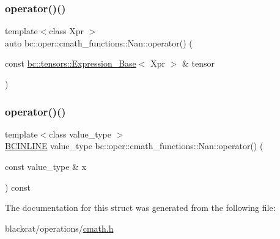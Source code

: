 \mbox{\label{structbc_1_1oper_1_1cmath__functions_1_1Nan_a662d1e5841e0d6d1da990d5fb4ab940d}} 
\subsubsection{\texorpdfstring{operator()()}{operator()()}\hspace{0.1cm}{\footnotesize\ttfamily [2/3]}}
{\footnotesize\ttfamily template$<$class Xpr $>$ \\
auto bc\+::oper\+::cmath\+\_\+functions\+::\+Nan\+::operator() (\begin{DoxyParamCaption}\item[{const \hyperlink{classbc_1_1tensors_1_1Expression__Base}{bc\+::tensors\+::\+Expression\+\_\+\+Base}$<$ Xpr $>$ \&}]{tensor }\end{DoxyParamCaption})\hspace{0.3cm}{\ttfamily [inline]}}

\mbox{\label{structbc_1_1oper_1_1cmath__functions_1_1Nan_a7679125e1815040c8d037d1c2ae3adad}} 
\subsubsection{\texorpdfstring{operator()()}{operator()()}\hspace{0.1cm}{\footnotesize\ttfamily [3/3]}}
{\footnotesize\ttfamily template$<$class value\+\_\+type $>$ \\
\hyperlink{common_8h_a6699e8b0449da5c0fafb878e59c1d4b1}{B\+C\+I\+N\+L\+I\+NE} value\+\_\+type bc\+::oper\+::cmath\+\_\+functions\+::\+Nan\+::operator() (\begin{DoxyParamCaption}\item[{const value\+\_\+type \&}]{x }\end{DoxyParamCaption}) const\hspace{0.3cm}{\ttfamily [inline]}}



The documentation for this struct was generated from the following file\+:\begin{DoxyCompactItemize}
\item 
blackcat/operations/\hyperlink{cmath_8h}{cmath.\+h}\end{DoxyCompactItemize}
